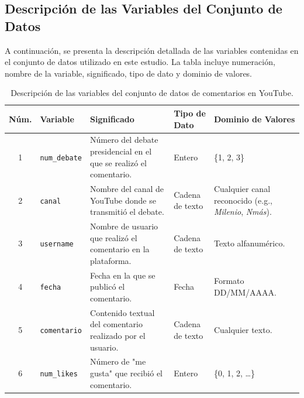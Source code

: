 \documentclass[10pt, a4paper]{article}
\begin{document}
	
	\subsection{Descripción de las Variables del Conjunto de Datos}
	
	A continuación, se presenta la descripción detallada de las variables contenidas en el conjunto de datos utilizado en este estudio. La tabla incluye numeración, nombre de la variable, significado, tipo de dato y dominio de valores.
	
	\begin{table}[h]
		\centering
		\begin{tabular}{|c|l|p{6cm}|l|p{4cm}|}
			\hline
			\textbf{Núm.} & \textbf{Variable} & \textbf{Significado} & \textbf{Tipo de Dato} & \textbf{Dominio de Valores} \\
			\hline
			1 & \texttt{num\_debate} & Número del debate presidencial en el que se realizó el comentario. & Entero & \{1, 2, 3\} \\
			\hline
			2 & \texttt{canal} & Nombre del canal de YouTube donde se transmitió el debate. & Cadena de texto & Cualquier canal reconocido (e.g., \textit{Milenio}, \textit{Nmás}). \\
			\hline
			3 & \texttt{username} & Nombre de usuario que realizó el comentario en la plataforma. & Cadena de texto & Texto alfanumérico. \\
			\hline
			4 & \texttt{fecha} & Fecha en la que se publicó el comentario. & Fecha & Formato DD/MM/AAAA. \\
			\hline
			5 & \texttt{comentario} & Contenido textual del comentario realizado por el usuario. & Cadena de texto & Cualquier texto. \\
			\hline
			6 & \texttt{num\_likes} & Número de "me gusta" que recibió el comentario. & Entero & \{0, 1, 2, \dots\} \\
			\hline
		\end{tabular}
		\caption{Descripción de las variables del conjunto de datos de comentarios en YouTube.}
		\label{tab:variables_dataset}
	\end{table}
	
\end{document}
